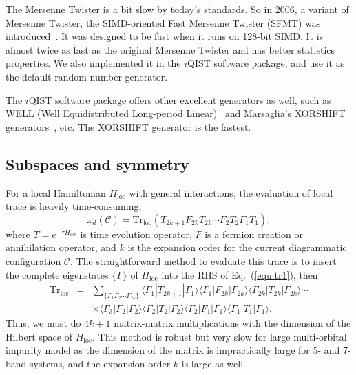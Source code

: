 The Mersenne Twister is a bit slow by today's standards. So in 2006, a variant of Mersenne Twister, the SIMD-oriented Fast Mersenne Twister (SFMT) was introduced~\cite{sfmt:2008}. It was designed to be fast when it runs on 128-bit SIMD. It is almost twice as fast as the original Mersenne Twister and has better statistics properties. We also implemented it in the $i$QIST software package, and use it as the default random number generator.

The $i$QIST software package offers other excellent generators as well, such as WELL (Well Equidistributed Long-period Linear)~\cite{Panneton:2006} and Marsaglia's XORSHIFT generators~\cite{Marsaglia:2003}, etc. The XORSHIFT generator is the fastest.

\subsection{Subspaces and symmetry\label{subsec:subspace}}
For a local Hamiltonian $H_{\text{loc}}$ with general interactions, the evaluation of local trace is heavily time-consuming,
\begin{equation}
\label{equ:tr1}
\omega_{d}(\mathcal{C}) = 
\text{Tr}_{\text{loc}} (T_{2k+1}F_{2k}T_{2k} \cdots F_{2}T_{2}F_{1}T_{1}),
\end{equation}  
where $T=e^{-\tau H_{\text{loc}}}$ is time evolution operator, $F$ is a fermion creation or annihilation operator, and $k$ is the expansion order for the current diagrammatic configuration $\mathcal{C}$. The straightforward method to evaluate this trace is to insert the complete eigenstates $\{ \Gamma \}$ of $H_{\text{loc}}$ into the RHS of Eq.~(\ref{equ:tr1}), then 
\begin{eqnarray}\label{equ:tr2}
\text{Tr}_{\text{loc}} &= &\sum_{\{\Gamma_{1}\Gamma_{2} \cdots \Gamma_{2k}\}} 
            \langle\Gamma_{1}|T_{2k+1}|\Gamma_{1}\rangle
            \langle\Gamma_{1}|F_{2k}|\Gamma_{2k}\rangle
            \langle\Gamma_{2k}|T_{2k}|\Gamma_{2k}\rangle \cdots \nonumber \\  
          & &\times \langle\Gamma_{3}|F_{2}|\Gamma_{2}\rangle
            \langle\Gamma_{2}|T_{2}|\Gamma_{2}\rangle
            \langle\Gamma_{2}|F_{1}|\Gamma_{1}\rangle
            \langle\Gamma_{1}|T_{1}|\Gamma_{1}\rangle.
\end{eqnarray}
Thus, we must do $4k+1$ matrix-matrix multiplications with the dimension of the Hilbert space of $H_{\text{loc}}$. This method is robust but very slow for large multi-orbital impurity model as the dimension of the matrix is impractically large for 5- and 7-band systems, and the expansion order $k$ is large as well.


